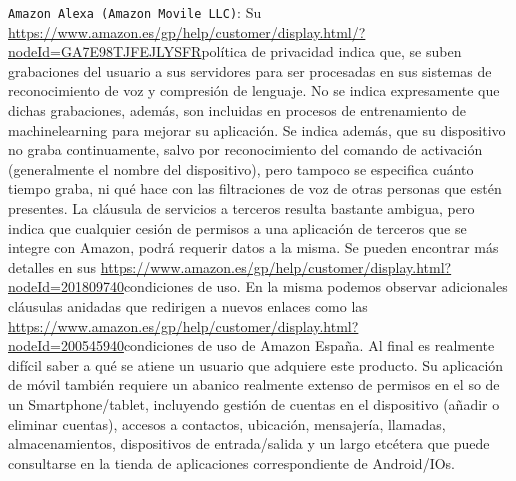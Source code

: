 \verb|Amazon Alexa (Amazon Movile LLC)|: Su \url{https://www.amazon.es/gp/help/customer/display.html/?nodeId=GA7E98TJFEJLYSFR}{política de privacidad} indica que, se suben grabaciones del usuario a sus servidores para ser procesadas en sus sistemas de reconocimiento de voz y compresión de lenguaje. No se indica expresamente que dichas grabaciones, además, son incluidas en procesos de entrenamiento de \gls{machinelearning} para mejorar su aplicación. Se indica además, que su dispositivo no graba continuamente, salvo por reconocimiento del comando de activación (generalmente el nombre del dispositivo), pero tampoco se especifica cuánto tiempo graba, ni qué hace con las filtraciones de voz de otras personas que estén presentes. La cláusula de servicios a terceros resulta bastante ambigua, pero indica que cualquier cesión de permisos a una aplicación de terceros que se integre con Amazon, podrá requerir datos a la misma. Se pueden encontrar más detalles en sus \url{https://www.amazon.es/gp/help/customer/display.html?nodeId=201809740}{condiciones de uso}. En la misma podemos observar adicionales cláusulas anidadas que redirigen a nuevos enlaces como las  \url{https://www.amazon.es/gp/help/customer/display.html?nodeId=200545940}{condiciones de uso de Amazon España}. Al final es realmente difícil saber a qué se atiene un usuario que adquiere este producto. Su aplicación de móvil también requiere un abanico realmente extenso de permisos en el \gls{so} de un Smartphone/tablet, incluyendo gestión de cuentas en el dispositivo (añadir o eliminar cuentas), accesos a contactos, ubicación, mensajería, llamadas, almacenamientos, dispositivos de entrada/salida y un largo etcétera que puede consultarse en la tienda de aplicaciones correspondiente de Android/IOs.

\vspace{1cm}


